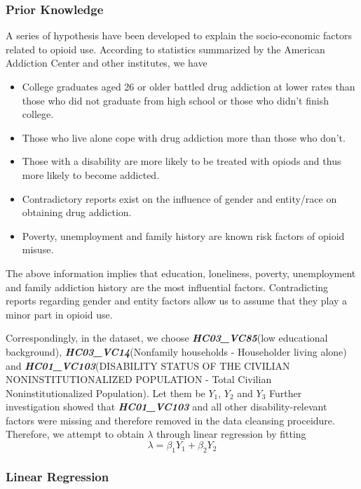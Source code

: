 \subsubsection{Prior Knowledge}
A series of hypothesis have been developed to explain the socio-economic factors related to opioid use. According to statistics summarized by the American Addiction Center and other institutes\cite{10}\cite{11}, we have
\begin{itemize}
	\item College graduates aged 26 or older battled drug addiction at lower rates than those who did not graduate from high school or those who didn’t finish college.
	\item Those who live alone cope with drug addiction more than those who don't.
	\item Those with a disability are more likely to be treated with opiods and thus more likely to become addicted.
	\item Contradictory reports exist on the influence of gender and entity/race on obtaining drug addiction. 
	\item Poverty, unemployment and family history are known risk factors of opioid misuse.
\end{itemize}
The above information implies that education, loneliness, poverty, unemployment and family addiction history are the most influential factors. Contradicting reports regarding gender and entity factors allow us to assume that they play a minor part in opioid use.

Correspondingly, in the dataset, we choose \textit{\bfseries HC03\_VC85}(low educational background), \textit{\bfseries HC03\_VC14}(Nonfamily households - Householder living alone) and \textit{\bfseries HC01\_VC103}(DISABILITY STATUS OF THE CIVILIAN NONINSTITUTIONALIZED POPULATION - Total Civilian Noninstitutionalized Population). Let them be $Y_1$, $Y_2$ and $Y_3$ Further investigation showed that \textit{\bfseries HC01\_VC103} and all other disability-relevant factors were missing and therefore removed in the data cleansing proceidure. Therefore, we attempt to obtain $\lambda$ through linear regression by fitting
\begin{equation}
\lambda = \beta_1 Y_1 + \beta_2 Y_2
\end{equation}
\subsubsection{Linear Regression}


